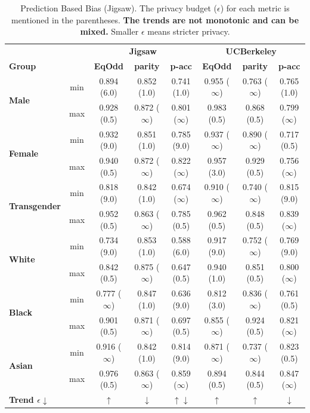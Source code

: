 \documentclass[11pt]{article} %
\begin{document}
\begin{table}[!htbp]
\centering
\begin{adjustbox}{max width=0.8\textwidth}
\begin{tabular}{@{}lcccc|ccc@{}}
\toprule
& & \multicolumn{3}{c}{\textbf{Jigsaw}} & \multicolumn{3}{c}{\textbf{UCBerkeley}} \\ \cmidrule{3-8}
 \textbf{Group} & & \textbf{EqOdd}  & \textbf{parity} & \textbf{p-acc} & \textbf{EqOdd}  & \textbf{parity} & \textbf{p-acc} \\ \midrule

\multirow{2}{*}{\textbf{Male}} & min & 0.894 (6.0) & 0.852 (1.0) & 0.741 (1.0) & 0.955 ($\infty$) & 0.763 ($\infty$)& 0.765 (1.0)\\ 
& max & 0.928 (0.5) & 0.872 ($\infty$) &0.801 ($\infty$) & 0.983 (0.5) & 0.868 (0.5) & 0.799 ($\infty$)\\ \cmidrule{2-8}
\multirow{2}{*}{\textbf{Female}} & min & 0.932 (9.0)& 0.851 (1.0) & 0.785 (9.0) & 0.937 ($\infty$) & 0.890 ($\infty$) & 0.717 (0.5)\\ 
& max & 0.940 (0.5) & 0.872 ($\infty$) & 0.822 ($\infty$) & 0.957 (3.0) & 0.929 (0.5)& 0.756 ($\infty$)\\ \cmidrule{2-8}
\multirow{2}{*}{\textbf{Transgender}} & min & 0.818 (9.0)& 0.842 (1.0) & 0.674 ($\infty$) & 0.910 ($\infty$) & 0.740 ($\infty$)& 0.815 (9.0)\\ 
& max & 0.952 (0.5) & 0.863 ($\infty$) & 0.785 (0.5) & 0.962 (0.5)& 0.848 (0.5) & 0.839 ($\infty$)\\ 
\midrule
\multirow{2}{*}{\textbf{White}} & min & 0.734 (9.0)& 0.853 (1.0) & 0.588 (6.0) & 0.917 (9.0) & 0.752 ($\infty$) & 0.769 (9.0) \\ 
& max & 0.842 (0.5)& 0.875 ($\infty$)& 0.647 (0.5) & 0.940 (1.0) & 0.851 (0.5) & 0.800 ($\infty$)\\ \cmidrule{2-8}
\multirow{2}{*}{\textbf{Black}} & min & 0.777 ($\infty$)& 0.847 (1.0)& 0.636 (9.0) & 0.812 (3.0) & 0.836 ($\infty$)& 0.761 (0.5)\\ 
& max & 0.901 (0.5)& 0.871 ($\infty$)& 0.697 (0.5) & 0.855 ($\infty$) & 0.924 (0.5) & 0.821 ($\infty$) \\ \cmidrule{2-8}
\multirow{2}{*}{\textbf{Asian}} & min & 0.916 ($\infty$) & 0.842 (1.0)& 0.814 (9.0) & 0.871 ($\infty$) & 0.737 ($\infty$) & 0.823 (0.5) \\ 
& max & 0.976 (0.5)& 0.863 ($\infty$) & 0.859 ($\infty$) & 0.894 (0.5) & 0.844 (0.5) & 0.847 ($\infty$) \\ \midrule
\textbf{Trend $\epsilon \downarrow$} & & $\uparrow$ & $\downarrow $ & $\uparrow\downarrow$ & $\uparrow$ & $\uparrow$ & $\downarrow$\\
\bottomrule
\end{tabular}
\end{adjustbox}
\caption{Prediction Based Bias (Jigsaw). The privacy budget ($\epsilon$) for each metric is mentioned in the parentheses. \textbf{The trends are not monotonic and can be mixed.} Smaller $\epsilon$ means stricter privacy.}
\label{table:prediction_bias}
\end{table}
\end{document}
